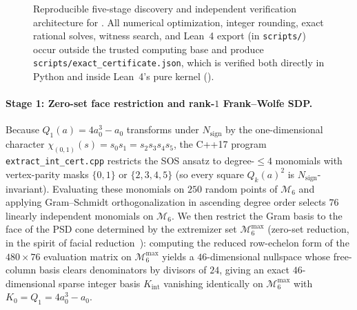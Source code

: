 \documentclass[11pt,a4paper]{article}
\theoremstyle{plain}
\theoremstyle{definition}
\theoremstyle{remark}
\newcommand{\Z}{\mathbb{Z}}
\newcommand{\Mman}{\mathcal{M}_6}
\newcommand{\code}[1]{\texttt{\small #1}}
\begin{document}
\begin{figure}[t]
{%
  }
  \caption{Reproducible five-stage discovery and independent verification architecture for . All numerical optimization, integer rounding, exact rational solves, witness search, and Lean~4 export (in \code{scripts/}) occur outside the trusted computing base and produce \code{scripts/\allowbreak exact\_certificate.json}, which is verified both directly in Python and inside Lean~4's pure kernel ().}
  \label{fig:cert-pipeline}
\end{figure}

\paragraph{Stage 1: Zero-set face restriction and rank-$1$ Frank--Wolfe SDP.}
Because $Q_1(a) = 4a_0^3 - a_0$ transforms under $N_{\mathrm{sign}}$ by the one-dimensional character $\chi_{(0,1)}(s) = s_0 s_1 = s_2 s_3 s_4 s_5$, the C++17 program \code{extract\_int\_cert.cpp} restricts the SOS ansatz to degree-$\le 4$ monomials with vertex-parity masks $\{0,1\}$ or $\{2,3,4,5\}$ (so every square $Q_k(a)^2$ is $N_{\mathrm{sign}}$-invariant). Evaluating these monomials on $250$ random points of $\Mman$ and applying Gram--Schmidt orthogonalization in ascending degree order selects $76$ linearly independent monomials on $\Mman$. We then restrict the Gram basis to the face of the PSD cone determined by the extremizer set $\Mman^{\max}$ (zero-set reduction, in the spirit of facial reduction~\cite{PermenterParrilo2018}): computing the reduced row-echelon form of the $480 \times 76$ evaluation matrix on $\Mman^{\max}$ yields a $46$-dimensional nullspace whose free-column basis clears denominators by divisors of $24$, giving an exact $46$-dimensional sparse integer basis $K_{\mathrm{int}}$ vanishing identically on $\Mman^{\max}$ with $K_0 = Q_1 = 4a_0^3 - a_0$.
\end{document}
